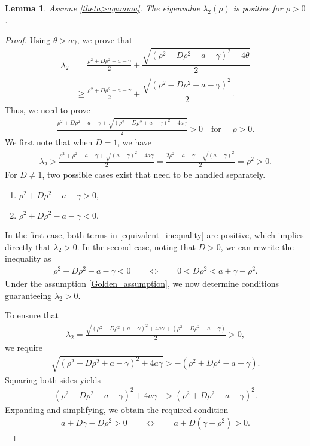 \documentclass[11pt]{article}
\newtheorem{lemma}[thm]{Lemma}
\theoremstyle{definition}
\begin{document}
\begin{lemma}
  Assume \eqref{theta>agamma}. The eigenvalue  $\lambda_2(\rho)$ is positive for $\rho>0$. 
\end{lemma}
\begin{proof}
    Using $\theta> a\gamma$, we prove that \begin{align}\label{equivalent_inequality}
            \lambda_2&=  \frac{\rho^2+D \rho^2-a- \gamma}{2} +\dfrac{\sqrt{(\rho^2- D \rho^2+a- \gamma)^2+ 4 \theta}}{2}\\& \geq  \frac{\rho^2+D \rho^2-a- \gamma}{2} +\dfrac{ \sqrt{(\rho^2- D \rho^2+a- \gamma)^2}}{2}.
        \end{align}
Thus, we need to prove 
\begin{align}
    \frac{\rho^2+D \rho^2-a- \gamma + \sqrt{(\rho^2- D \rho^2+a- \gamma)^2+4a \gamma}}{2}>0 \quad \text{for } \quad \rho>0.
\end{align}
We first note that when $D=1$, we have 
\begin{align}\label{D=1}
   \lambda_2> \frac{\rho^2+ \rho^2-a- \gamma + \sqrt{(a- \gamma)^2+4a \gamma}}{2}=\frac{2\rho^2-a- \gamma + \sqrt{(a+ \gamma)^2}}{2}= \rho^2>0.
\end{align}
For $D \ne 1$,
two possible cases exist that need to be handled separately.
\begin{enumerate}
    \item $\rho^2+D \rho^2-a- \gamma>0$, \item $\rho^2+D \rho^2-a- \gamma<0$.
\end{enumerate}

In the first case, both terms in \eqref{equivalent_inequality} are positive, which implies directly that $\lambda_2>0$.  
In the second case, noting that $D>0$, we can rewrite the inequality as  
\begin{align} \label{Golden_assumption}
    \rho^2 + D\rho^2 - a - \gamma < 0 
    \qquad\Longleftrightarrow\qquad 
    0 < D\rho^2 < a + \gamma - \rho^2.
\end{align}
Under the assumption \eqref{Golden_assumption}, we now determine conditions guaranteeing $\lambda_2>0$.

To ensure that 
\begin{align}
    \lambda_2
    =\frac{ \sqrt{(\rho^2 - D\rho^2 + a - \gamma)^2 + 4a\gamma}
        + (\rho^2 + D\rho^2 - a - \gamma)}{2}
    >0,
\end{align}
we require
\begin{align}
    \sqrt{(\rho^2 - D\rho^2 + a - \gamma)^2 + 4a\gamma}
    > -(\rho^2 + D\rho^2 - a - \gamma).
\end{align}
Squaring both sides yields
\begin{align}
    (\rho^2 - D\rho^2 + a - \gamma)^2 + 4a\gamma
    &> (\rho^2 + D\rho^2 - a - \gamma)^2.
\end{align}
Expanding and simplifying, we obtain the required condition
\begin{align} \label{lambda2_requirement}
    a + D\gamma - D\rho^2 > 0
    \qquad\Longleftrightarrow\qquad
    a + D(\gamma - \rho^2) > 0.
\end{align}


\end{proof}
\end{document}
